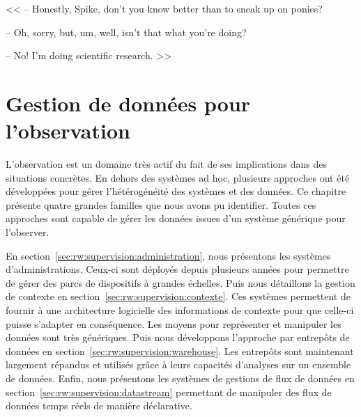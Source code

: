 \begin{savequote}[6cm]
<< -- Honestly, Spike, don't you know better than to sneak up on ponies?

-- Oh, sorry, but, um, well, isn't that what you're doing?

-- No! I'm doing scientific research. >>
\end{savequote}

\chapter{Gestion de données pour l'observation}\label{chap:rw:supervision}
\chaptertoc

L'observation est un domaine très actif du fait de ses implications dans des situations concrètes. En dehors des systèmes ad hoc, plusieurs approches ont été développées pour gérer l'hétérogénéité des systèmes et des données. Ce chapitre présente quatre grandes familles que nous avons pu identifier. Toutes ces approches sont capable de gérer les données issues d'un système générique pour l'observer.

En section~\ref{sec:rw:supervision:administration}, nous présentons les systèmes d'administrations. Ceux-ci sont déployés depuis plusieurs années pour permettre de gérer des parcs de dispositifs à grandes échelles. Puis nous détaillons la gestion de contexte en section~\ref{sec:rw:supervision:contexte}. Ces systèmes permettent de fournir à une architecture logicielle des informations de contexte pour que celle-ci puisse s'adapter en conséquence. Les moyens pour représenter et manipuler les données sont très génériques. Puis nous développons l'approche par entrepôts de données en section~\ref{sec:rw:supervision:warehouse}. Les entrepôts sont maintenant largement répandus et utilisés grâce à leurs capacités d'analyses sur un ensemble de données. Enfin, nous présentons les systèmes de gestions de flux de données en section~\ref{sec:rw:supervision:datastream} permettant de manipuler des flux de données temps réels de manière déclarative.






